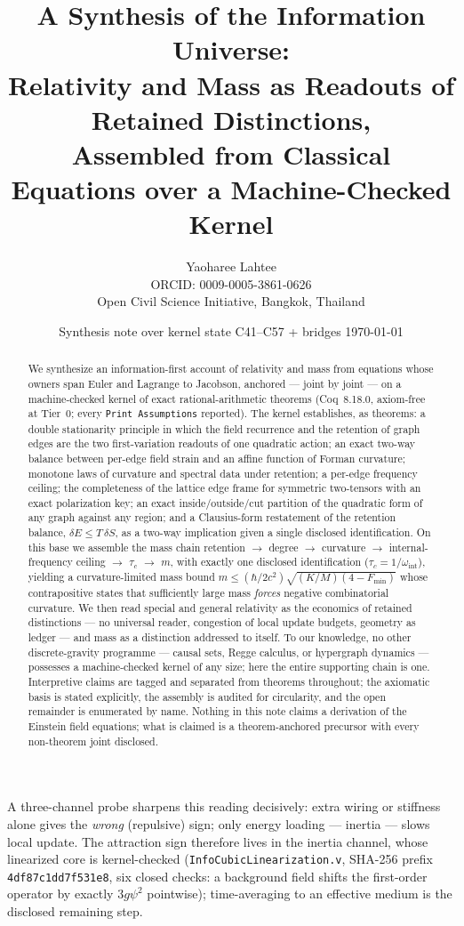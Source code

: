 \documentclass[10pt,twocolumn]{article}
\title{\bfseries A Synthesis of the Information Universe:\\
Relativity and Mass as Readouts of Retained Distinctions,\\
Assembled from Classical Equations over a Machine-Checked Kernel}
\author{Yaoharee Lahtee\\[2pt]
\small ORCID: 0009-0005-3861-0626\\
\small Open Civil Science Initiative, Bangkok, Thailand}
\date{\small Synthesis note over kernel state C41--C57 + bridges \;\textbullet\; \today}
\theoremstyle{definition}
\newcommand{\code}[1]{\texttt{#1}}
\begin{document}
\maketitle
\thispagestyle{preprintfirst}

\begin{abstract}
\noindent
We synthesize an information-first account of relativity and mass from equations whose
owners span Euler and Lagrange to Jacobson, anchored --- joint by
joint --- on a machine-checked kernel of exact rational-arithmetic theorems (Coq~8.18.0,
axiom-free at Tier~0; every \code{Print Assumptions} reported). The kernel establishes,
as theorems: a double stationarity principle in which the field recurrence and the
retention of graph edges are the two first-variation readouts of one quadratic action;
an exact two-way balance between per-edge field strain and an affine function of Forman
curvature; monotone laws of curvature and spectral data under retention; a per-edge
frequency ceiling; the completeness of the lattice edge frame for symmetric two-tensors
with an exact polarization key; an exact inside/outside/cut partition of the quadratic
form of any graph against any region; and a Clausius-form restatement of the retention
balance, $\delta E \le T\,\delta S$, as a two-way implication given a single disclosed
identification. On this base we assemble the mass chain
retention $\to$ degree $\to$ curvature $\to$ internal-frequency ceiling
$\to$ $\tau_c$ $\to$ $m$, with exactly one disclosed identification
($\tau_c = 1/\omega_{\mathrm{int}}$), yielding a curvature-limited mass bound
$m \le (\hbar/2c^2)\sqrt{(K/M)(4-F_{\min})}$ whose contrapositive states that
sufficiently large mass \emph{forces} negative combinatorial curvature. We then read
special and general relativity as the economics of retained distinctions ---
no universal reader, congestion of local update budgets, geometry as ledger --- and
mass as a distinction addressed to itself. To our knowledge, no other discrete-gravity programme --- causal sets, Regge
calculus, or hypergraph dynamics --- possesses a machine-checked kernel of any size;
here the entire supporting chain is one. Interpretive claims are tagged and separated
from theorems throughout; the axiomatic basis is stated explicitly, the assembly is
audited for circularity, and the open remainder is enumerated by name. Nothing in this
note claims a derivation of the Einstein field equations; what is claimed is a
theorem-anchored precursor with every non-theorem joint disclosed.
\end{abstract} A three-channel probe sharpens this reading decisively: extra wiring or
stiffness alone gives the \emph{wrong} (repulsive) sign; only energy loading ---
inertia --- slows local update. The attraction sign therefore lives in the
inertia channel, whose linearized core is kernel-checked
(\code{InfoCubicLinearization.v}, SHA-256 prefix \code{4df87c1dd7f531e8}, six
closed checks: a background field shifts the first-order operator by exactly
$3g\psi^2$ pointwise); time-averaging to an effective medium is the disclosed
remaining step.
\end{document}
